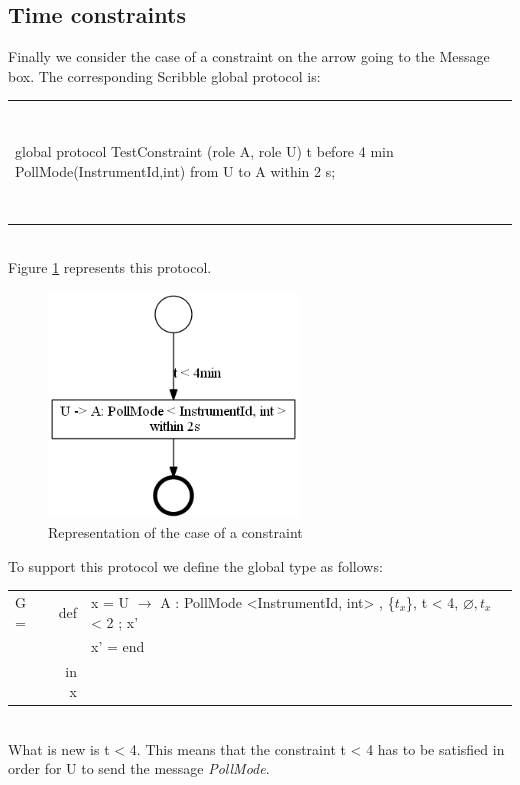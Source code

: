 \documentclass[a4paper,11pt,twoside]{report}
\begin{document}
\subsection{Time constraints}
Finally we consider the case of a constraint on the arrow going to the Message box. The corresponding Scribble global protocol is:\\
\begin{tabular}{ll}
~&~\\
\begin{SJLISTING}
global protocol TestConstraint (role A, role U) {
	t before 4 min
	PollMode(InstrumentId,int) from U to A within 2 s;
}
\end{SJLISTING}
&\\
~&~\\
\end{tabular}\\
Figure \ref{fig:cons} represents this protocol.

\begin{figure}[h]
\begin{center}
\includegraphics[height=6cm]{TestConstraint}\caption{Representation of the case of a constraint}\label{fig:cons}
\end{center}
\end{figure}

To support this protocol we define the global type as follows:\\
\begin{tabular}{lrl}
G = & def & x = U $\rightarrow$ A : PollMode <InstrumentId, int> , \{$t_{x}$\}, t < 4, $\varnothing, t_{x}$ < 2  ;  x’\\
&& x’ = end\\
& in x&\\
\end{tabular}\\
What is new is t < 4. This means that the constraint t < 4 has to be satisfied in order for U to send the message \emph{PollMode}.
\end{document}
